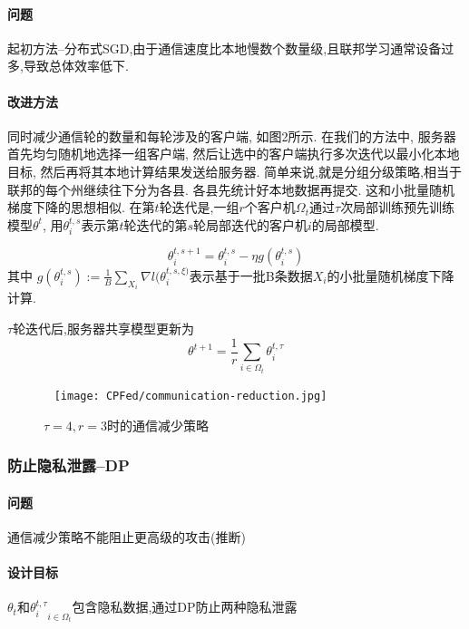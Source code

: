 \paragraph{问题} 起初方法--分布式SGD,由于通信速度比本地慢数个数量级,且联邦学习通常设备过多,导致总体效率低下.

\paragraph{改进方法}
同时减少通信轮的数量和每轮涉及的客户端, 如图2所示. 在我们的方法中, 服务器首先均匀随机地选择一组客户端, 然后让选中的客户端执行多次迭代以最小化本地目标, 然后再将其本地计算结果发送给服务器. 
简单来说,就是分组分级策略,相当于联邦的每个州继续往下分为各县. 各县先统计好本地数据再提交. 这和小批量随机梯度下降的思想相似.
在第$t$轮迭代是,一组$r$个客户机$\Omega_t$通过$\tau$次局部训练预先训练模型$\theta^t$,
用$\theta_i^{t,s}$表示第$t$轮迭代的第$s$轮局部迭代的客户机$i$的局部模型.

\begin{equation}
    \theta^{t,s+1}_i= \theta_i^{t,s}- \eta g(\theta_i^{t,s})
\end{equation}
其中 $g(\theta_i^{t,s}) := \frac{1}{B} \sum_{X_i} \nabla l(\theta_i^{t,s,\xi)}$表示基于一批B条数据$X_i$的小批量随机梯度下降计算. 

$\tau$轮迭代后,服务器共享模型更新为 
\begin{equation}
    \theta^{t+1}=\frac{1}{r} \sum_{i\in \Omega_t} \theta_i^{t,\tau} 
\end{equation}
 

\begin{figure}[ht]
    \
    \setlength{\abovecaptionskip}{0.1cm}
    \centering    
    \texttt{[image: CPFed/communication-reduction.jpg]}
    \label{communication-reduction-strategies}
    \caption{$\tau=4,r=3 $时的通信减少策略}
\end{figure}
 
\subsubsection{防止隐私泄露--DP}

\paragraph{问题} 通信减少策略不能阻止更高级的攻击(推断)
\paragraph{设计目标} $\theta_t$和${\theta_i^{t, \tau}}_{i\in\Omega_t}$包含隐私数据,通过DP防止两种隐私泄露
